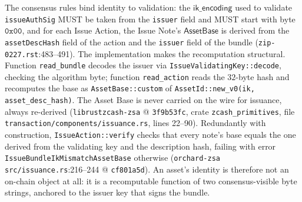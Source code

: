 \documentclass[11pt,a4paper]{article}
\theoremstyle{definition}
\begin{document}
The consensus rules bind identity to validation: the
$\mathsf{ik\_encoding}$ used to validate \texttt{issueAuthSig} MUST be
taken from the \texttt{issuer} field and MUST start with byte
$\mathtt{0x00}$, and for each Issue Action, the Issue Note's
$\mathsf{AssetBase}$ is derived from the \texttt{assetDescHash} field of
the action and the \texttt{issuer} field of the bundle
(\texttt{zip-0227.rst}:483--491). The implementation makes the
recomputation structural. Function \texttt{read\_bundle} decodes the
issuer via \texttt{IssueValidatingKey::decode}, checking the algorithm
byte; function \texttt{read\_action} reads the $32$-byte hash and
recomputes the base as \texttt{AssetBase::custom} of
\texttt{AssetId::new\_v0(ik, asset\_desc\_hash)}. The Asset Base is never
carried on the wire for issuance, always re-derived
(\texttt{librustzcash-zsa} @ \texttt{3f9b53fc}, crate
\texttt{zcash\_primitives}, file
\texttt{transaction/components/issuance.rs}, lines 22--90). Redundantly
with construction, \texttt{IssueAction::verify} checks that every note's
base equals the one derived from the validating key and the description
hash, failing with error \texttt{IssueBundleIkMismatchAssetBase}
otherwise (\texttt{orchard-zsa} \texttt{src/issuance.rs}:216--244 @
\texttt{cf801a5d}). An asset's
identity is therefore not an on-chain object at all: it is a recomputable
function of two consensus-visible byte strings, anchored to the issuer key
that signs the bundle.
\end{document}
